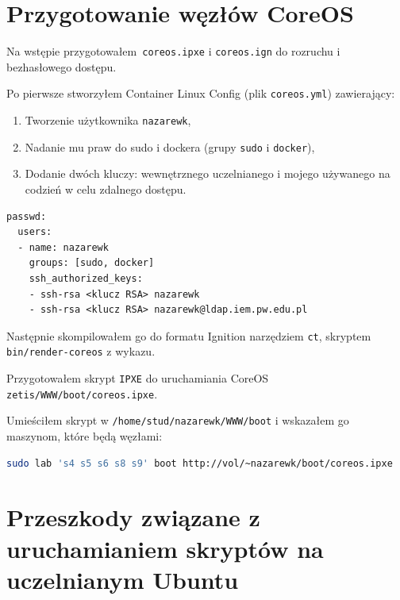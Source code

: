 \documentclass[a4paper,12pt,twoside,openany]{report}
\providecommand{\tightlist}{%
  \setlength{\itemsep}{0pt}\setlength{\parskip}{0pt}}
\newcommand{\passthrough}[1]{#1}
\begin{document}
\hypertarget{przygotowanie-wux119zux142uxf3w-coreos}{%
\section{Przygotowanie węzłów
CoreOS}\label{przygotowanie-wux119zux142uxf3w-coreos}}

Na wstępie przygotowałem~\passthrough{\lstinline!coreos.ipxe!} i
\passthrough{\lstinline!coreos.ign!} do rozruchu i bezhasłowego dostępu.

Po pierwsze stworzyłem Container Linux Config (plik
\passthrough{\lstinline!coreos.yml!}) zawierający:

\begin{enumerate}
\def\labelenumi{\arabic{enumi}.}
\tightlist
\item
  Tworzenie użytkownika \passthrough{\lstinline!nazarewk!},
\item
  Nadanie mu praw do sudo i dockera (grupy
  \passthrough{\lstinline!sudo!} i \passthrough{\lstinline!docker!}),
\item
  Dodanie dwóch kluczy: wewnętrznego uczelnianego i mojego używanego na
  codzień w celu zdalnego dostępu.
\end{enumerate}

\begin{lstlisting}
passwd:
  users:
  - name: nazarewk
    groups: [sudo, docker]
    ssh_authorized_keys:
    - ssh-rsa <klucz RSA> nazarewk
    - ssh-rsa <klucz RSA> nazarewk@ldap.iem.pw.edu.pl
\end{lstlisting}

Następnie skompilowałem go do formatu Ignition narzędziem
\passthrough{\lstinline!ct!}, skryptem
\passthrough{\lstinline!bin/render-coreos!} z wykazu.

Przygotowałem skrypt \passthrough{\lstinline!IPXE!} do uruchamiania
CoreOS \passthrough{\lstinline!zetis/WWW/boot/coreos.ipxe!}.

Umieściłem skrypt w
\passthrough{\lstinline!/home/stud/nazarewk/WWW/boot!} i wskazałem go
maszynom, które będą węzłami:

\begin{lstlisting}[language=bash]
sudo lab 's4 s5 s6 s8 s9' boot http://vol/~nazarewk/boot/coreos.ipxe 
\end{lstlisting}

\hypertarget{przeszkody-zwiux105zane-z-uruchamianiem-skryptuxf3w-na-uczelnianym-ubuntu}{%
\section{Przeszkody związane z uruchamianiem skryptów na uczelnianym
Ubuntu}\label{przeszkody-zwiux105zane-z-uruchamianiem-skryptuxf3w-na-uczelnianym-ubuntu}}
\end{document}
